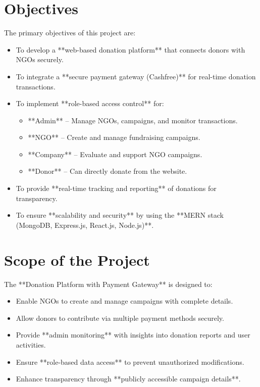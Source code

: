 \section{Objectives}
The primary objectives of this project are:
\begin{itemize}
    \item To develop a **web-based donation platform** that connects donors with NGOs securely.
    \item To integrate a **secure payment gateway (Cashfree)** for real-time donation transactions.
    \item To implement **role-based access control** for:
        \begin{itemize}
            \item **Admin** – Manage NGOs, campaigns, and monitor transactions.
            \item **NGO** – Create and manage fundraising campaigns.
            \item **Company** – Evaluate and support NGO campaigns.
            \item **Donor** – Can directly donate from the website.
        \end{itemize}
    \item To provide **real-time tracking and reporting** of donations for transparency.
    \item To ensure **scalability and security** by using the **MERN stack (MongoDB, Express.js, React.js, Node.js)**.
\end{itemize}

\section{Scope of the Project}
The **Donation Platform with Payment Gateway** is designed to:
\begin{itemize}
    \item Enable NGOs to create and manage campaigns with complete details.
    \item Allow donors to contribute via multiple payment methods securely.
    \item Provide **admin monitoring** with insights into donation reports and user activities.
    \item Ensure **role-based data access** to prevent unauthorized modifications.
    \item Enhance transparency through **publicly accessible campaign details**.
\end{itemize}

